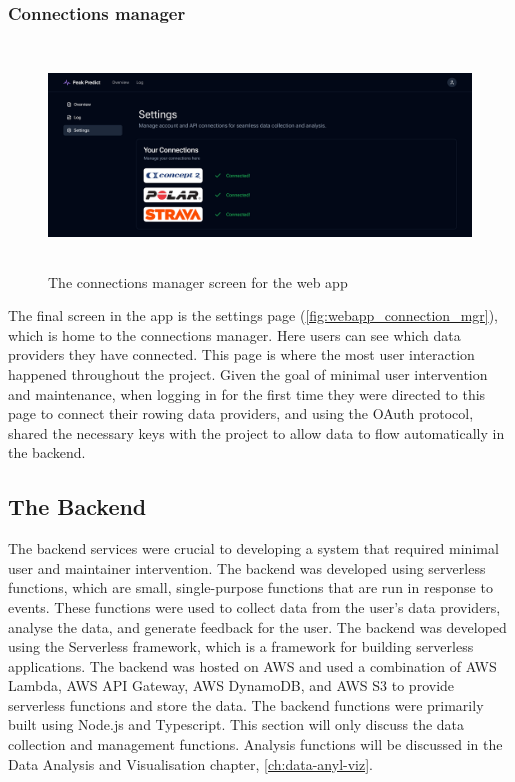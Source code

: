 \subsubsection{Connections manager}

\begin{figure}[htbp]
  \centering
  \includegraphics[height=6cm]{figures/fyp_connections_page.png}
  \captionsetup{justification=centering}
  \caption[Web app Connections Manager]{\label{fig:webapp_connection_mgr}The connections manager screen for the web app} 
\end{figure}
The final screen in the app is the settings page (\autoref{fig:webapp_connection_mgr}), which is home to the connections manager. Here users can see which data providers they have connected. This page is where the most user interaction happened throughout the project. Given the goal of minimal user intervention and maintenance, when logging in for the first time they were directed to this page to connect their rowing data providers, and using the OAuth protocol, shared the necessary keys with the project to allow data to flow automatically in the backend.  

\subsection{The Backend}
The backend services were crucial to developing a system that required minimal user and maintainer intervention. The backend was developed using serverless functions, which are small, single-purpose functions that are run in response to events. These functions were used to collect data from the user's data providers, analyse the data, and generate feedback for the user. The backend was developed using the Serverless framework, which is a framework for building serverless applications. The backend was hosted on AWS and used a combination of AWS Lambda, AWS API Gateway, AWS DynamoDB, and AWS S3 to provide serverless functions and store the data. The backend functions were primarily built using Node.js and Typescript. This section will only discuss the data collection and management functions. Analysis functions will be discussed in the Data Analysis and Visualisation chapter, \autoref{ch:data-anyl-viz}.

